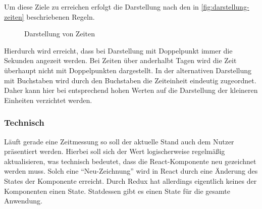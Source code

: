 Um diese Ziele zu erreichen erfolgt die Darstellung nach den in \autoref{fig:darstellung-zeiten} beschriebenen Regeln.

\begin{figure}[ht!]
    \centering
    \resizebox{\textwidth}{!}{
        
    }
    \caption{Darstellung von Zeiten}
    \label{fig:darstellung-zeiten}
\end{figure}




Hierdurch wird erreicht, dass bei Darstellung mit Doppelpunkt immer die Sekunden angezeit werden.
Bei Zeiten über anderhalbt Tagen wird die Zeit überhaupt nicht mit Doppelpunkten dargestellt.
In der alternativen Darstellung mit Buchstaben wird durch den Buchstaben die Zeiteinheit eindeutig zugeordnet.
Daher kann hier bei entsprechend hohen Werten auf die Darstellung der kleineren Einheiten verzichtet werden.

\subsubsection{Technisch}
Läuft gerade eine Zeitmessung so soll der aktuelle Stand auch dem Nutzer präsentiert werden.
Hierbei soll sich der Wert logischerweise regelmäßig aktualisieren,
was technisch bedeutet, dass die React-Komponente neu gezeichnet werden muss.
Solch eine \enquote{Neu-Zeichnung} wird in React durch eine Änderung des States der Komponente erreicht.
Durch Redux hat allerdings eigentlich keines der Komponenten einen State.
Statdessen gibt es einen State für die gesamte Anwendung.

